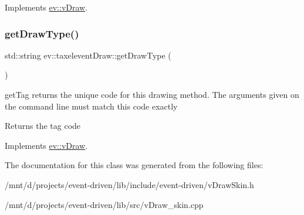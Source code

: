 Implements \hyperlink{classev_1_1vDraw_af1eee5dcdf3b4cfee6a3024e5cd706f8}{ev\+::v\+Draw}.

\mbox{\label{classev_1_1taxeleventDraw_a474b409ea48a97749caaf172f5fd467a}} 
\subsubsection{\texorpdfstring{get\+Draw\+Type()}{getDrawType()}}
{\footnotesize\ttfamily std\+::string ev\+::taxelevent\+Draw\+::get\+Draw\+Type (\begin{DoxyParamCaption}{ }\end{DoxyParamCaption})\hspace{0.3cm}{\ttfamily [virtual]}}



get\+Tag returns the unique code for this drawing method. The arguments given on the command line must match this code exactly 

\begin{DoxyReturn}{Returns}
the tag code 
\end{DoxyReturn}


Implements \hyperlink{classev_1_1vDraw_ac01381befeffef2b930cbceb28b18a28}{ev\+::v\+Draw}.



The documentation for this class was generated from the following files\+:\begin{DoxyCompactItemize}
\item 
/mnt/d/projects/event-\/driven/lib/include/event-\/driven/v\+Draw\+Skin.\+h\item 
/mnt/d/projects/event-\/driven/lib/src/v\+Draw\+\_\+skin.\+cpp\end{DoxyCompactItemize}
